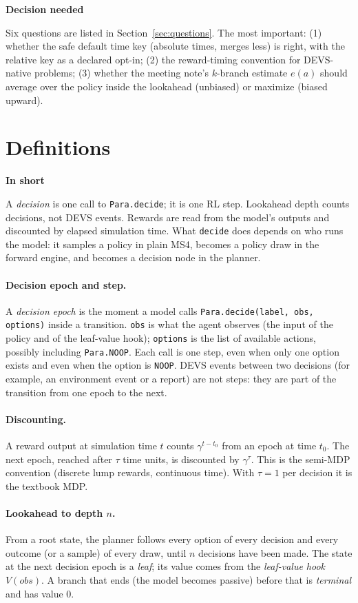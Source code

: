 \documentclass[11pt]{article}
\newcommand{\code}[1]{\texttt{#1}}
\newcommand{\shadedbox}[3]{\par\smallskip\noindent\colorbox{#1}{\parbox{\dimexpr\linewidth-2\fboxsep}{\textbf{#2}\par #3}}\par\smallskip}
\newcommand{\takeaway}[1]{\shadedbox{okbg}{In short}{#1}}
\newcommand{\decision}[1]{\shadedbox{warnbg}{Decision needed}{#1}}
\theoremstyle{plain}
\begin{document}
\decision{Six questions are listed in Section~\ref{sec:questions}. The most important: (1) whether the safe default
time key (absolute times, merges less) is right, with the relative key as a declared opt-in; (2) the reward-timing
convention for DEVS-native problems; (3) whether the meeting note's $k$-branch estimate $e(a)$ should average over the
policy inside the lookahead (unbiased) or maximize (biased upward).}

\newpage
\section{Definitions}\label{sec:defs}

\takeaway{A \emph{decision} is one call to \code{Para.decide}; it is one RL step. Lookahead depth counts decisions,
not DEVS events. Rewards are read from the model's outputs and discounted by elapsed simulation time. What
\code{decide} does depends on who runs the model: it samples a policy in plain MS4, becomes a policy draw in the
forward engine, and becomes a decision node in the planner.}

\paragraph{Decision epoch and step.} A \emph{decision epoch} is the moment a model calls
\code{Para.decide(label, obs, options)} inside a transition. \code{obs} is what the agent observes (the input of the
policy and of the leaf-value hook); \code{options} is the list of available actions, possibly including
\code{Para.NOOP}. Each call is one step, even when only one option exists and even when the option is
\code{NOOP}. DEVS events between two decisions (for example, an environment event or a report) are not steps: they
are part of the transition from one epoch to the next.

\paragraph{Discounting.} A reward output at simulation time $t$ counts $\gamma^{t-t_0}$ from an epoch at time $t_0$.
The next epoch, reached after $\tau$ time units, is discounted by $\gamma^{\tau}$. This is the semi-MDP convention
(discrete lump rewards, continuous time). With $\tau=1$ per decision it is the textbook MDP.

\paragraph{Lookahead to depth $n$.} From a root state, the planner follows every option of every decision and every
outcome (or a sample) of every draw, until $n$ decisions have been made. The state at the next decision epoch is a
\emph{leaf}; its value comes from the \emph{leaf-value hook} $V(\textit{obs})$. A branch that ends (the model becomes
passive) before that is \emph{terminal} and has value 0.
\end{document}
